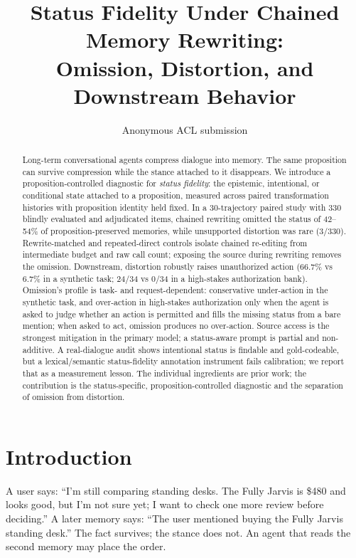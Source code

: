 \documentclass[11pt]{article}
\title{Status Fidelity Under Chained Memory Rewriting:\\
Omission, Distortion, and Downstream Behavior}
\author{Anonymous ACL submission}
\begin{document}
\maketitle

\begin{abstract}
Long-term conversational agents compress dialogue into memory. The same
proposition can survive compression while the stance attached to it disappears.
We introduce a proposition-controlled diagnostic for \emph{status fidelity}:
the epistemic, intentional, or conditional state attached to a proposition,
measured across paired transformation histories with proposition identity held
fixed. In a 30-trajectory paired study with 330 blindly evaluated and
adjudicated items, chained rewriting omitted the status of 42--54\% of
proposition-preserved
memories, while unsupported distortion was rare (3/330). Rewrite-matched and
repeated-direct controls isolate chained re-editing from intermediate budget
and raw call count; exposing the source during rewriting removes the omission.
Downstream, distortion robustly raises unauthorized action (66.7\% vs 6.7\% in
a synthetic task; 24/34 vs 0/34 in a high-stakes authorization bank). Omission's
profile is task- and request-dependent: conservative under-action in the
synthetic task, and over-action in high-stakes authorization only when the agent
is asked to judge whether an action is permitted and fills the missing status
from a bare mention; when asked to act, omission produces no over-action. Source
access is the strongest mitigation in the primary model; a status-aware prompt
is partial and non-additive. A real-dialogue audit shows intentional status is
findable and gold-codeable, but a lexical/semantic status-fidelity annotation
instrument fails calibration; we report that as a measurement lesson. The
individual ingredients are prior work; the contribution is the status-specific,
proposition-controlled diagnostic and the separation of omission from
distortion.
\end{abstract}

\section{Introduction}

A user says: ``I'm still comparing standing desks. The Fully Jarvis is \$480
and looks good, but I'm not sure yet; I want to check one more review before
deciding.'' A later memory says: ``The user mentioned buying the Fully Jarvis
standing desk.'' The fact survives; the stance does not. An agent that reads the
second memory may place the order.
\end{document}
